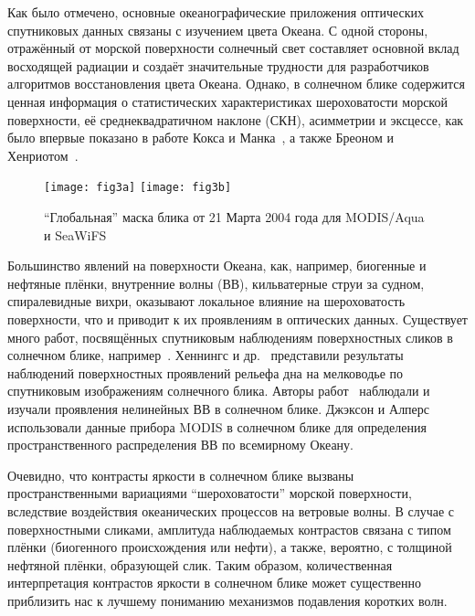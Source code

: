 Как было отмечено, основные океанографические приложения оптических спутниковых данных связаны с изучением цвета Океана. С одной стороны, отражённый от морской поверхности солнечный свет составляет основной вклад восходящей радиации и создаёт значительные трудности для разработчиков алгоритмов восстановления цвета Океана. Однако, в солнечном блике содержится ценная информация о статистических характеристиках шероховатости морской поверхности, её среднеквадратичном наклоне (СКН), асимметрии и эксцессе, как было впервые показано в работе Кокса и Манка~\citep{Cox1954, Cox1954a}, а также Бреоном и Хенриотом~\citep{Breon2006}.



\begin{figure}[!thb]
	\centering
    \subcaptionbox{\label{fig:3a}}
    {\texttt{[image: fig3a]}}
    \subcaptionbox{\label{fig:3b}}
    {\texttt{[image: fig3b]}}
    \\
    \caption{``Глобальная'' маска блика от 21 Марта 2004 года для MODIS/Aqua и SeaWiFS}
    \label{fig:3}
\end{figure}

Большинство явлений на поверхности Океана, как, например, биогенные и нефтяные плёнки, внутренние волны (ВВ), кильватерные струи за судном, спиралевидные вихри, оказывают локальное влияние на шероховатость поверхности, что и приводит к их проявлениям в оптических данных. Существует много работ, посвящённых спутниковым наблюдениям поверхностных сликов в солнечном блике, например~\citep{Adamo2005, Chust2007, Hu2009}. Хеннингс и др.~\citep{Hennings1994} представили результаты наблюдений поверхностных проявлений рельефа дна на мелководье по спутниковым изображениям солнечного блика. Авторы работ~\citep{Apel1975, Artale1990, Mitnik2000} наблюдали и изучали проявления нелинейных ВВ в солнечном блике. Джэксон и Алперс~\citep{Jackson2010} использовали данные прибора MODIS в солнечном блике для определения пространственного распределения ВВ по всемирному Океану.

Очевидно, что контрасты яркости в солнечном блике вызваны пространственными вариациями ``шероховатости'' морской поверхности, вследствие воздействия океанических процессов на ветровые волны. В случае с поверхностными сликами, амплитуда наблюдаемых контрастов связана с типом плёнки (биогенного происхождения или нефти), а также, вероятно, с толщиной нефтяной плёнки, образующей слик. Таким образом, количественная интерпретация контрастов яркости в солнечном блике может существенно приблизить нас к лучшему пониманию механизмов подавления коротких волн.

